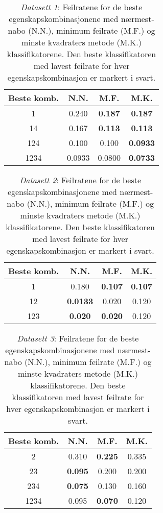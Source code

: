 \documentclass[twocolumn,norwegian]{article}
\begin{document}
\begin{table}[h!]
	\centering
	\begin{tabular}{| c | c  c  c |}
		\hline
		\rule{0pt}{10pt}Beste komb. & N.N. & M.F. & M.K. \\
		\hline
		\rule{0pt}{10pt}1 & 0.240 & \textbf{0.187} & \textbf{0.187} \\
		\hline
		14 & 0.167 & \textbf{0.113} & \textbf{0.113} \\
		\hline
		124 & 0.100 & 0.100 & \textbf{0.0933} \\
		\hline
		1234 & 0.0933 & 0.0800 & \textbf{0.0733} \\
		\hline
	\end{tabular}
	\caption{\textit{Datasett 1}: Feilratene for de beste egenskapskombinasjonene med nærmest-nabo (N.N.), minimum feilrate (M.F.) og minste kvadraters metode (M.K.) klassifikatorene. Den beste klassifikatoren med lavest feilrate for hver egenskapskombinasjon er markert i svart.}
	\label{tab:Data1}
\end{table}
\begin{table}[h!]
	\centering
	\begin{tabular}{| c | c  c  c |}
		\hline
		\rule{0pt}{10pt}Beste komb. & N.N. & M.F. & M.K. \\
		\hline
		\rule{0pt}{10pt}1 & 0.180 & \textbf{0.107} & \textbf{0.107} \\
		\hline
		12 & \textbf{0.0133} & 0.020 & 0.120 \\
		\hline
		123 & \textbf{0.020} & \textbf{0.020} & 0.120 \\
		\hline
	\end{tabular}
	\caption{\textit{Datasett 2}: Feilratene for de beste egenskapskombinasjonene med nærmest-nabo (N.N.), minimum feilrate (M.F.) og minste kvadraters metode (M.K.) klassifikatorene. Den beste klassifikatoren med lavest feilrate for hver egenskapskombinasjon er markert i svart.}
	\label{tab:Data2}
\end{table}
\begin{table}[h!]
	\centering
	\begin{tabular}{| c | c  c  c |}
		\hline
		\rule{0pt}{10pt}Beste komb. & N.N. & M.F. & M.K. \\
		\hline
		\rule{0pt}{10pt}2 & 0.310 & \textbf{0.225} & 0.335 \\
		\hline
		23 & \textbf{0.095} & 0.200 & 0.200 \\
		\hline
		234 & \textbf{0.075} & 0.130 & 0.160 \\
		\hline
		1234 & 0.095 & \textbf{0.070} & 0.120 \\
		\hline
	\end{tabular}
	\caption{\textit{Datasett 3}: Feilratene for de beste egenskapskombinasjonene med nærmest-nabo (N.N.), minimum feilrate (M.F.) og minste kvadraters metode (M.K.) klassifikatorene. Den beste klassifikatoren med lavest feilrate for hver egenskapskombinasjon er markert i svart.}
	\label{tab:Data3}
\end{table}
\end{document}
